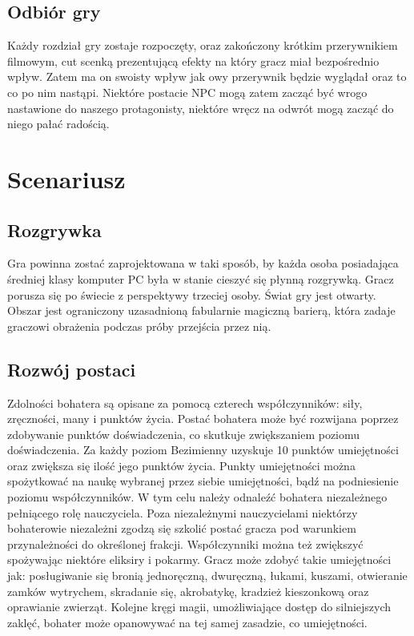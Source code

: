 \documentclass[11pt,polish, openany]{book}
\begin{document}
\section{Odbiór gry}
Każdy rozdział gry zostaje rozpoczęty, oraz zakończony krótkim przerywnikiem filmowym, cut scenką prezentującą efekty na który gracz miał bezpośrednio wpływ. Zatem ma on swoisty wpływ jak owy przerywnik będzie wyglądał oraz to co po nim nastąpi. Niektóre postacie NPC mogą zatem zacząć być wrogo nastawione do naszego protagonisty, niektóre wręcz na odwrót mogą zacząć do niego pałać radością.
\chapter{Scenariusz}\label{chapt:results}
\section{Rozgrywka}
Gra powinna zostać zaprojektowana w taki sposób, by każda osoba posiadająca średniej klasy komputer PC była w stanie cieszyć się płynną rozgrywką. Gracz porusza się po świecie z perspektywy trzeciej osoby. Świat gry jest otwarty. Obszar jest ograniczony uzasadnioną fabularnie magiczną barierą, która zadaje graczowi obrażenia podczas próby przejścia przez nią.
\section{Rozwój postaci}
Zdolności bohatera są opisane za pomocą czterech współczynników: siły, zręczności, many i punktów życia. Postać bohatera może być rozwijana poprzez zdobywanie punktów doświadczenia, co skutkuje zwiększaniem poziomu doświadczenia. Za każdy poziom Bezimienny uzyskuje 10 punktów umiejętności oraz zwiększa się ilość jego punktów życia. Punkty umiejętności można spożytkować na naukę wybranej przez siebie umiejętności, bądź na podniesienie poziomu współczynników. W tym celu należy odnaleźć bohatera niezależnego pełniącego rolę nauczyciela. Poza niezależnymi nauczycielami niektórzy bohaterowie niezależni zgodzą się szkolić postać gracza pod warunkiem przynależności do określonej frakcji. Współczynniki można też zwiększyć spożywając niektóre eliksiry i pokarmy. Gracz może zdobyć takie umiejętności jak: posługiwanie się bronią jednoręczną, dwuręczną, łukami, kuszami, otwieranie zamków wytrychem, skradanie się, akrobatykę, kradzież kieszonkową oraz oprawianie zwierząt. Kolejne kręgi magii, umożliwiające dostęp do silniejszych zaklęć, bohater może opanowywać na tej samej zasadzie, co umiejętności.
\end{document}
